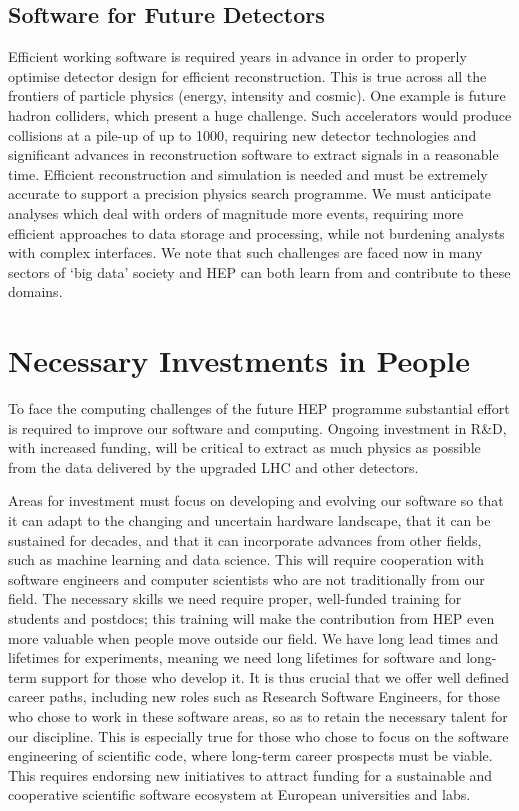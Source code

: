 \documentclass[11pt,a4paper]{article}
\begin{document}
\subsection*{Software for Future
Detectors}\label{software-for-future-detectors}

Efficient working software is required years in advance in order to
properly optimise detector design for efficient reconstruction. This is
true across all the frontiers of particle physics (energy, intensity and
cosmic). One example is future hadron colliders, which present a huge
challenge. Such accelerators would produce collisions at a pile-up of up
to 1000, requiring new detector technologies and significant advances in
reconstruction software to extract signals in a reasonable time.
Efficient reconstruction and simulation is needed and must be extremely
accurate to support a precision physics search programme. We must
anticipate analyses which deal with orders of magnitude more events,
requiring more efficient approaches to data storage and processing,
while not burdening analysts with complex interfaces. We note that such
challenges are faced now in many sectors of `big data' society and HEP
can both learn from and contribute to these domains.

\section*{Necessary Investments in
People}\label{necessary-investments-in-people}

To face the computing challenges of the future HEP programme substantial
effort is required to improve our software and computing. Ongoing
investment in R\&D, with increased funding, will be critical to extract
as much physics as possible from the data delivered by the upgraded LHC
and other detectors.

Areas for investment must focus on developing and evolving our software
so that it can adapt to the changing and uncertain hardware landscape,
that it can be sustained for decades, and that it can incorporate
advances from other fields, such as machine learning and data science.
This will require cooperation with software engineers and computer
scientists who are not traditionally from our field. The necessary
skills we need require proper, well-funded training for students and
postdocs; this training will make the contribution from HEP even more
valuable when people move outside our field. We have long lead times and
lifetimes for experiments, meaning we need long lifetimes for software
and long-term support for those who develop it. It is thus crucial that
we offer well defined career paths, including new roles such as Research
Software Engineers, for those who chose to work in these software areas,
so as to retain the necessary talent for our discipline. This is
especially true for those who chose to focus on the software engineering
of scientific code, where long-term career prospects must be viable.
This requires endorsing new initiatives to attract funding for a
sustainable and cooperative scientific software ecosystem at European
universities and labs.
\end{document}
